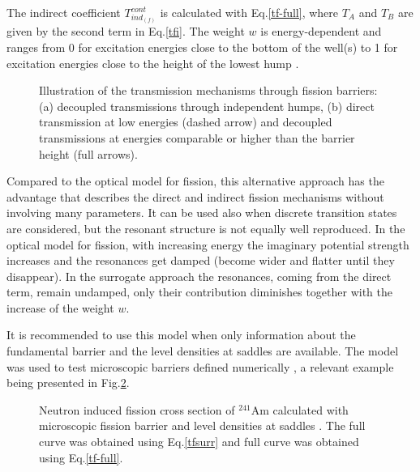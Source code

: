 \documentclass[twocolumn,amsmath,amssymb,10pt,groupedaddress,letter]{revtex4}
\begin{document}
The indirect coefficient $T_{ind_{(f)}}^{cont}$ is calculated with Eq.\ref{tf-full}, where $T_A$ and $T_B$ are given by the
second term in Eq.\ref{tfi}.
The weight $w$ is energy-dependent and ranges from 0 for excitation energies close to the
bottom of the well(s) to 1 for excitation energies close to the height of the lowest hump
\cite{Sin:07}.
%
\begin{figure}[htbp]
\caption{Illustration of the transmission mechanisms through fission barriers:
(a) decoupled transmissions through independent humps,
(b) direct transmission at low energies (dashed arrow) and decoupled transmissions at
energies comparable or higher than the barrier height (full arrows).}
\label{fis-ld0.eps}
\end{figure}
%
Compared to the optical model for fission, this alternative approach has the advantage that
describes the direct and indirect fission mechanisms without involving many parameters.
It can be used also when discrete transition states are considered, but the resonant
structure is not equally well reproduced. In the optical model for fission, with increasing
energy  the imaginary potential strength increases and the resonances get damped
(become wider and flatter until they disappear). In the surrogate approach the resonances,
coming from the direct term, remain undamped, only their contribution diminishes together
with the increase of the weight $w$.

It is recommended to use this model when only information about the fundamental barrier and
the level densities at saddles are available. The model was used to test microscopic
barriers defined numerically \cite{Sin:07}, a relevant example being presented in
Fig.\ref{am41-surr}.
%
\begin{figure}[htbp]
\caption{Neutron induced fission cross section of $^{241}$Am calculated with microscopic
fission barrier \cite{Goriely:07-mass} and level densities at saddles \cite{Goriely:07-ld}.
The full curve was obtained using Eq.\ref{tfsurr} and full curve was obtained using
Eq.\ref{tf-full}.}
\label{am41-surr}
\end{figure}
%

\medskip
\end{document}
